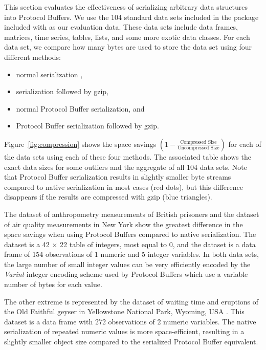 \documentclass[article]{jss}
\begin{document}
This section evaluates the effectiveness of serializing arbitrary
 data structures into Protocol Buffers.  We use the
104 standard data sets included in the  package
included with  as our evaluation data. These data sets
include data frames, matrices, time series, tables, lists, and some
more exotic data classes.  For each data set, we compare how many
bytes are used to store the data set using four different methods:
%
\begin{itemize}
\item normal  serialization \citep{serialization},
\item {} serialization followed by gzip,
\item normal Protocol Buffer serialization, and
\item Protocol Buffer serialization followed by gzip.
\end{itemize}
%
Figure~\ref{fig:compression} shows the space savings $\left(1 - \frac{\textrm{Compressed Size}}{\textrm{Uncompressed Size}}\right)$ for each of the data sets using each of these four methods.  The associated table shows the exact data sizes for some outliers and the aggregate of all 104 data sets.
Note that Protocol Buffer serialization results in slightly
smaller byte streams compared to native  serialization in most cases (red dots),
but this difference disappears if the results are compressed with gzip (blue triangles).

The  dataset of anthropometry measurements of British
prisoners \citep{garson1900metric} and the  dataset
of air quality measurements in New York show the greatest difference
in the space savings when using Protocol Buffers compared to
 native serialization.  The  dataset is a 42
$\times$ 22 table of integers, most equal to 0, and the
 dataset is a data frame of 154 observations of 1
numeric and 5 integer variables.  In both data sets, the large number
of small integer values can be very efficiently encoded by the
\emph{Varint} integer encoding scheme used by Protocol Buffers which
use a variable number of bytes for each value.

The other extreme is represented by the  dataset of
waiting time and eruptions of the Old Faithful geyser in Yellowstone
National Park, Wyoming, USA \citep{azzalini1990look}.  This dataset is
a data frame with 272 observations of 2 numeric variables.  The
 native serialization of repeated numeric values is more
space-efficient, resulting in a slightly smaller object size compared
to the serialized Protocol Buffer equivalent.
\end{document}
